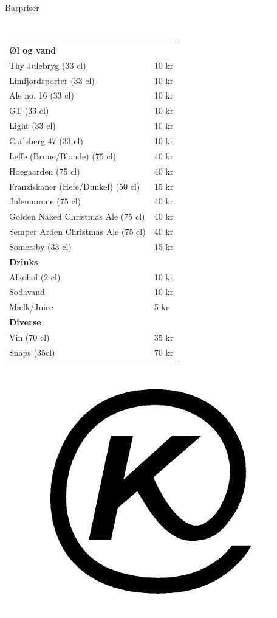 \begin{flushleft}
\begin{huge}
Barpriser
\end{huge}
\\[.1cm]
\begin{table}[h!]
\begin{tabular}{p{} p{}}
\textbf{Øl og vand} & \\
Thy Julebryg (33 cl) & 10 kr\\
Limfjordsporter (33 cl) & 10 kr\\
Ale no. 16 (33 cl) & 10 kr\\
GT (33 cl) & 10 kr\\
Light (33 cl) & 10 kr\\
Carlsberg 47 (33 cl) & 10 kr\\
Leffe (Brune/Blonde) (75 cl) & 40 kr\\
Hoegaarden (75 cl) & 40 kr\\
Franziskaner (Hefe/Dunkel) (50 cl) & 15 kr\\
Julemumme (75 cl) & 40 kr\\
Golden Naked Christmas Ale (75 cl) & 40 kr\\
Semper Arden Christmas Ale (75 cl) & 40 kr\\
    Somersby (33 cl) & 15 kr \\[2ex]
\textbf{Drinks} & \\
Alkohol (2 cl) & 10 kr \\
Sodavand & 10 kr \\
    Mælk/Juice & 5 kr \\[2ex]
\textbf{Diverse} & \\
Vin (70 cl) & 35 kr\\
Snaps (35cl) & 70 kr\\
\end{tabular}
\end{table}
\end{flushleft}
\begin{figure}[h!]
    \begin{center}
    \includegraphics[width=.35\linewidth]{../logo.jpg}
\end{center}
\end{figure}
